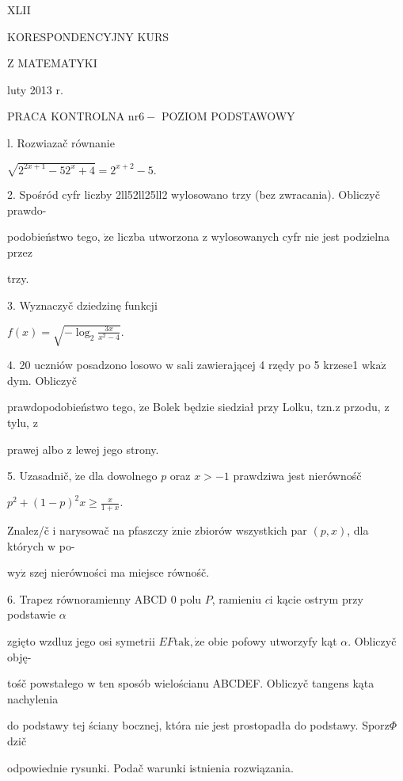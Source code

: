 \documentclass[a4paper,12pt]{article}
\begin{document}
XLII

KORESPONDENCYJNY KURS

Z MATEMATYKI

luty 2013 r.

PRACA KONTROLNA $\mathrm{n}\mathrm{r} 6-$ POZIOM PODSTAWOWY

l. Rozwiazač równanie

$\sqrt{2^{2x+1}-52^{x}+4}=2^{x+2}-5.$

2. Spośród cyfr liczby 2ll52ll25ll2 wylosowano trzy (bez zwracania). Obliczyč prawdo-

podobieństwo tego, $\dot{\mathrm{z}}\mathrm{e}$ liczba utworzona $\mathrm{z}$ wylosowanych cyfr nie jest podzielna przez

trzy.

3. Wyznaczyč dziedzinę funkcji

$f(x)=\sqrt{-\log_{2}\frac{3x}{x^{2}-4}}.$

4. 20 uczniów posadzono losowo $\mathrm{w}$ sali zawierającej 4 rzędy po 5 krzese1 $\mathrm{w}\mathrm{k}\mathrm{a}\dot{\mathrm{z}}$ dym. Obliczyč

prawdopodobieństwo tego, $\dot{\mathrm{z}}\mathrm{e}$ Bolek będzie siedział przy Lolku, $\mathrm{t}\mathrm{z}\mathrm{n}. \mathrm{z}$ przodu, $\mathrm{z}$ tylu, $\mathrm{z}$

prawej albo $\mathrm{z}$ lewej jego strony.

5. Uzasadnič, $\dot{\mathrm{z}}\mathrm{e}$ dla dowolnego $p$ oraz $x>-1$ prawdziwa jest nierównośč

$p^{2}+(1-p)^{2}x\displaystyle \geq\frac{x}{1+x}.$

Znalez/č $\mathrm{i}$ narysowač na pfaszczy $\acute{\mathrm{z}}\mathrm{n}\mathrm{i}\mathrm{e}$ zbiorów wszystkich par $(p,x)$, dla których $\mathrm{w}$ po-

$\mathrm{w}\mathrm{y}\dot{\mathrm{z}}$ szej nierówności ma miejsce równośč.

6. Trapez równoramienny ABCD $0$ polu $P$, ramieniu $c\mathrm{i}$ kącie ostrym przy podstawie $\alpha$

zgięto wzdluz jego osi symetrii $EF\mathrm{t}\mathrm{a}\mathrm{k}, \dot{\mathrm{z}}\mathrm{e}$ obie pofowy utworzyfy kąt $\alpha$. Obliczyč obję-

tośč powstałego $\mathrm{w}$ ten sposób wielościanu ABCDEF. Obliczyč tangens kąta nachylenia

do podstawy tej ściany bocznej, która nie jest prostopadła do podstawy. Sporz$\Phi$dzič

odpowiednie rysunki. Podač warunki istnienia rozwiązania.
\end{document}
